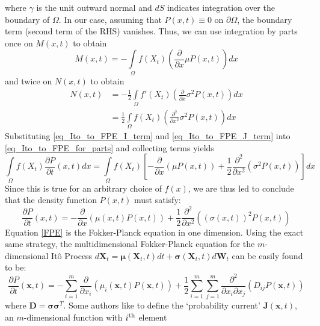 where $\gamma$ is the unit outward normal and $dS$ indicates integration over the boundary of $\Omega$. In our case, assuming that $P(x,t) \equiv 0$ on $\partial \Omega$, the boundary term (second term of the RHS) vanishes. Thus, we can use integration by parts once on $M(x,t)$ to obtain
\begin{equation}
	\label{eq_Ito_to_FPE_I_term}
	M(x,t) = - \int\limits_{\Omega}f(X_t)\left(\frac{\partial}{\partial x}\mu P(x,t)\right)dx
\end{equation}
and twice on $N(x,t)$ to obtain
\begin{align}
	N(x,t) &= - \frac{1}{2}\int\limits_{\Omega}f'(X_t)\left(\frac{\partial}{\partial x}\sigma^2 P(x,t)\right)dx\nonumber\\
	&= \frac{1}{2}\int\limits_{\Omega}f(X_t)\left(\frac{\partial^2}{\partial x^2}\sigma^2 P(x,t)\right)dx\label{eq_Ito_to_FPE_J_term}
\end{align}
Substituting \eqref{eq_Ito_to_FPE_I_term} and \eqref{eq_Ito_to_FPE_J_term} into \eqref{eq_Ito_to_FPE_for_parts} and collecting terms yields
\begin{equation*}
	\int\limits_{\Omega}f(X_t)\frac{\partial P}{\partial t}(x,t)dx = \int\limits_{\Omega}f(X_t)\left[-\frac{\partial}{\partial x}(\mu P(x,t)) + \frac{1}{2}\frac{\partial^2}{\partial x^2}(\sigma^2P(x,t))\right]dx
\end{equation*}
Since this is true for an arbitrary choice of $f(x)$, we are thus led to conclude that the density function $P(x,t)$ must satisfy:
\begin{equation}
	\label{FPE}
	\boxed{\frac{\partial P}{\partial t}(x,t) =-\frac{\partial}{\partial x}\left(\mu(x,t) P(x,t)\right) + \frac{1}{2}\frac{\partial^2}{\partial x^2}\left((\sigma(x,t))^2P(x,t)\right)}
\end{equation}
Equation \eqref{FPE} is the Fokker-Planck equation in one dimension. Using the exact same strategy, the multidimensional Fokker-Planck equation for the $m$-dimensional It\^{o} Process $d\mathbf{X}_t = \boldsymbol{\mu}(\mathbf{X}_t,t)dt + \boldsymbol{\sigma}(\mathbf{X}_t,t)d\mathbf{W}_t$ can be easily found to be:
\begin{equation}
	\label{app_FPE_ndim}
	\frac{\partial P}{\partial t}(\mathbf{x},t) =-\sum\limits_{i=1}^{m}\frac{\partial}{\partial x_i}\left(\mu_i(\mathbf{x},t) P(\mathbf{x},t)\right) + \frac{1}{2}\sum\limits_{i=1}^{m}\sum\limits_{j=1}^{m}\frac{\partial^2}{\partial x_i \partial x_j}\left(D_{ij}P(\mathbf{x},t)\right)
\end{equation}
where $\mathbf{D} = \mathbf{\sigma}\mathbf{\sigma}^T$. Some authors like to define the `probability current' $\mathbf{J}(\mathbf{x},t)$, an $m$-dimensional function with $i\textsuperscript{th}$ element
